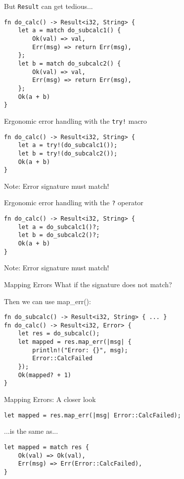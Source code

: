 
\begin{frame}[fragile]{But \texttt{Result} can get tedious...}
\begin{verbatim}
fn do_calc() -> Result<i32, String> {
    let a = match do_subcalc1() {
        Ok(val) => val,
        Err(msg) => return Err(msg),
    };
    let b = match do_subcalc2() {
        Ok(val) => val,
        Err(msg) => return Err(msg),
    };
    Ok(a + b)
}
\end{verbatim}
\end{frame}


\begin{frame}[fragile]{Ergonomic error handling with the \texttt{try!} macro}
\begin{verbatim}
fn do_calc() -> Result<i32, String> {
    let a = try!(do_subcalc1());
    let b = try!(do_subcalc2());
    Ok(a + b)
}
\end{verbatim}
Note: Error signature must match!
\end{frame}


\begin{frame}[fragile]{Ergonomic error handling with the \texttt{?} operator}
\begin{verbatim}
fn do_calc() -> Result<i32, String> {
    let a = do_subcalc1()?;
    let b = do_subcalc2()?;
    Ok(a + b)
}
\end{verbatim}
Note: Error signature must match!
\end{frame}


\begin{frame}[fragile]{Mapping Errors}
What if the signature does not match?

Then we can use map\_err():
\begin{verbatim}
fn do_subcalc() -> Result<i32, String> { ... }
fn do_calc() -> Result<i32, Error> {
    let res = do_subcalc();
    let mapped = res.map_err(|msg| {
        println!("Error: {}", msg);
        Error::CalcFailed
    });
    Ok(mapped? + 1)
}
\end{verbatim}
\end{frame}


\begin{frame}[fragile]{Mapping Errors: A closer look}
\begin{verbatim}
let mapped = res.map_err(|msg| Error::CalcFailed);
\end{verbatim}
...is the same as...
\begin{verbatim}
let mapped = match res {
    Ok(val) => Ok(val),
    Err(msg) => Err(Error::CalcFailed),
}
\end{verbatim}
\end{frame}


